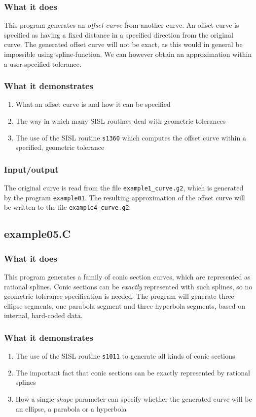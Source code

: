 \subsubsection{What it does}
This program generates an \emph{offset curve} from another curve.  An offset curve is
specified as having a fixed distance in a specified direction from the original curve.
The generated offset curve will not be exact, as this would in general be impossible using
spline-function.  We can however obtain an approximation within a user-specified tolerance.

\subsubsection{What it demonstrates}
\begin{enumerate}
\item What an offset curve is and how it can be specified
\item The way in which many SISL routines deal with geometric tolerances
\item The use of the SISL routine \verb/s1360/ which computes the offset curve within a 
specified, geometric tolerance
\end{enumerate}
\subsubsection{Input/output}
The original curve is read from the file \verb/example1_curve.g2/, which is generated by
the program \verb/example01/.  The resulting approximation of the offset curve will be 
written to the file \verb/example4_curve.g2/.

\subsection{example05.C}

\subsubsection{What it does}
This program generates a family of conic section curves, which are represented as rational
splines.  Conic sections can be \emph{exactly} represented with such splines, so no geometric 
tolerance specification is needed.  The program will generate three ellipse segments, one
parabola segment and three hyperbola segments, based on internal, hard-coded data.

\subsubsection{What it demonstrates}
\begin{enumerate}
\item The use of the SISL routine \verb/s1011/ to generate all kinds of conic sections
\item The important fact that conic sections can be exactly represented by rational splines
\item How a single \emph{shape} parameter can specify whether the generated curve will be an
ellipse, a parabola or a hyperbola
\end{enumerate}
